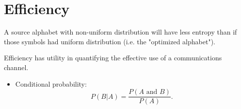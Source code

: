 \section{Efficiency}

A source alphabet with non-uniform distribution will have less entropy than if those symbols had uniform distribution (i.e. the "optimized alphabet"). 

Efficiency has utility in quantifying the effective use of a communications channel.


	\begin{itemize}
		
		\item Conditional probability:
		\begin{equation*}
		P(B|A)=\frac{P\left( A\text{ and }B\right) }{P\left( A\right) }.
		\end{equation*}
		
	\end{itemize}


